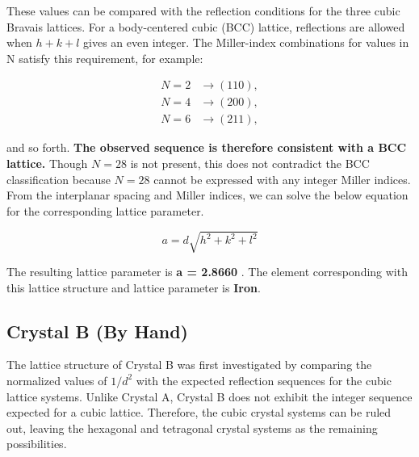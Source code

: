\documentclass[12pt]{article}
\begin{document}
These values can be compared with the reflection conditions for the three cubic Bravais lattices. For a body-centered cubic (BCC) lattice, reflections are allowed when $h+k+l$ gives an even integer. The Miller-index combinations for values in N satisfy this requirement, for example:

\[
\begin{aligned}
N=2 &\rightarrow (110),\\
N=4 &\rightarrow (200),\\
N=6 &\rightarrow (211),
\end{aligned}
\]

and so forth. \textbf{The observed sequence is therefore consistent with a BCC lattice.} Though $N=28$ is not present, this does not contradict the BCC classification because $N=28$ cannot be expressed with any integer Miller indices. From the interplanar spacing and Miller indices, we can solve the below equation for the corresponding lattice parameter.

\begin{equation}
    a = d\sqrt{h^2+k^2+l^2}
\end{equation}

The resulting lattice parameter is \textbf{a = 2.8660 \text{\AA}}. The element corresponding with this lattice structure and lattice parameter is \textbf{Iron}.

\subsection{Crystal B (By Hand)}
The lattice structure of Crystal B was first investigated by comparing the normalized values of $1/d^2$ with the expected reflection sequences for the cubic lattice systems. Unlike Crystal A, Crystal B does not exhibit the integer sequence expected for a cubic lattice. Therefore, the cubic crystal systems can be ruled out, leaving the hexagonal and tetragonal crystal systems as the remaining possibilities.
\end{document}
